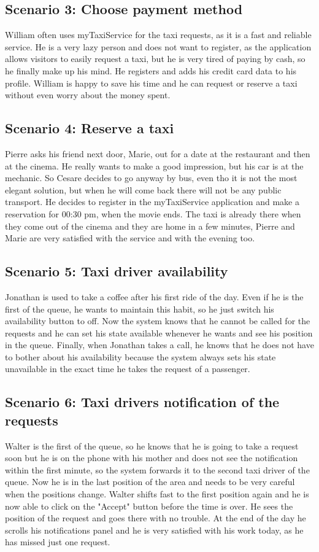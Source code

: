 \documentclass[18pt,oneside,a4paper, titlepage]{article}
\begin{document}
	\subsection{Scenario 3: Choose payment method}
		William often uses myTaxiService for the taxi requests, as it is a fast and reliable service. He is a very lazy person and does not want to register, as the application allows visitors to easily request a taxi, but he is very tired of paying by cash, so he finally make up his mind. He registers and adds his credit card data to his profile. William is happy to save his time and he can request or reserve a taxi without even worry about the money spent.
	
	\subsection{Scenario 4: Reserve a taxi}
		Pierre asks his friend next door, Marie, out for a date at the restaurant and then at the cinema. He really wants to make a good impression, but his car is at the mechanic. So Cesare decides to go anyway by bus, even tho it is not the most elegant solution, but when he will come back there will not be any public transport. He decides to register in the myTaxiService application and make a reservation for 00:30 pm, when the movie ends. The taxi is already there when they come out of the cinema and they are home in a few minutes, Pierre and Marie are very satisfied with the service and with the evening too.
		
	\subsection{Scenario 5: Taxi driver availability}
		Jonathan is used to take a coffee after his first ride of the day. Even if he is the first of the queue, he wants to maintain this habit, so he just switch his availability button to off. Now the system knows that he cannot be called for the requests and he can set his state available whenever he wants and see his position in the queue. Finally, when Jonathan takes a call, he knows that he does not have to bother about his availability because the system always sets his state unavailable in the exact time he takes the request of a passenger.
		
	\subsection{Scenario 6: Taxi drivers notification of the requests}
		Walter is the first of the queue, so he knows that he is going to take a request soon but he is on the phone with his mother and does not see the notification within the first minute, so the system forwards it to the second taxi driver of the queue. Now he is in the last position of the area and needs to be very careful when the positions change. Walter shifts fast to the first position again and he is now able to click on the "Accept" button before the time is over. He sees the position of the request and goes there with no trouble. At the end of the day he scrolls his notifications panel and he is very satisfied with his work today, as he has missed just one request.
\newpage
\end{document}
